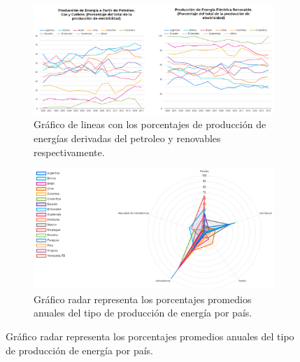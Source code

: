 \documentclass[spanish, letterpaper, 12 pt, conference]{ieeeconf}  %
\begin{document}
\begin{figure}[H]
\caption{Gráficos representando los indicadores. Versión Final de la visualización.}
\begin{subfigure}{\textwidth}
  \centering
  \includegraphics[width=1\linewidth]{./img/prodv2.png}
  \caption{Gráfico de lineas con los porcentajes de producción de energías derivadas del petroleo y renovables respectivamente.}
  \label{fig:prodv2}
\end{subfigure}
\begin{subfigure}{\textwidth}
  \centering
  \includegraphics[width=1\linewidth]{./img/spiderv2.png}
  \caption{Gráfico radar representa los porcentajes promedios anuales del tipo de producción de energía por país.}
  \label{fig:tiposv2}
\end{subfigure}
\label{fig:version_2}
\end{figure}
\end{document}
